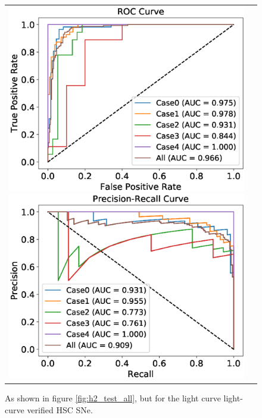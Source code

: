 \documentclass[proof]{pasj01}
\providecommand{\DIFadd}[1]{{\protect\color{blue} \sf #1}} %
\providecommand{\DIFdel}[1]{{\protect\color{red} \scriptsize #1}} %
\providecommand{\DIFaddFL}[1]{\DIFadd{#1}} %
\providecommand{\DIFdelFL}[1]{\DIFdel{#1}} %
\providecommand{\DIFaddbeginFL}{} %
\providecommand{\DIFaddendFL}{} %
\providecommand{\DIFdelbeginFL}{} %
\providecommand{\DIFdelendFL}{} %
\newcommand{\DIFscaledelfig}{0.5}
\newlength{\DIFdelgraphicswidth} %
\newlength{\DIFdelgraphicsheight} %
\newcommand{\DIFaddincludegraphics}[2][]{{\color{blue}\fbox{\DIFOincludegraphics[#1]{#2}}}} %
\newcommand{\DIFdelincludegraphics}[2][]{%
\sbox{\DIFdelgraphicsbox}{\DIFOincludegraphics[#1]{#2}}%
\settoboxwidth{\DIFdelgraphicswidth}{\DIFdelgraphicsbox} %
\settoboxtotalheight{\DIFdelgraphicsheight}{\DIFdelgraphicsbox} %
\scalebox{\DIFscaledelfig}{%
\parbox[b]{\DIFdelgraphicswidth}{\usebox{\DIFdelgraphicsbox}\\[-\baselineskip] \rule{\DIFdelgraphicswidth}{0em}}\llap{\resizebox{\DIFdelgraphicswidth}{\DIFdelgraphicsheight}{%
\setlength{\unitlength}{\DIFdelgraphicswidth}%
\begin{picture}(1,1)%
\thicklines\linethickness{2pt} %
{\color[rgb]{1,0,0}\put(0,0){\framebox(1,1){}}}%
{\color[rgb]{1,0,0}\put(0,0){\line( 1,1){1}}}%
{\color[rgb]{1,0,0}\put(0,1){\line(1,-1){1}}}%
\end{picture}%
}\hspace*{3pt}}} %
} %
\DeclareRobustCommand{\DIFaddbeginFL}{\DIFOaddbeginFL \let\includegraphics\DIFaddincludegraphics} %
\DeclareRobustCommand{\DIFaddendFL}{\DIFOaddendFL \let\includegraphics\DIFOincludegraphics} %
\DeclareRobustCommand{\DIFdelbeginFL}{\DIFOdelbeginFL \let\includegraphics\DIFdelincludegraphics} %
\DeclareRobustCommand{\DIFdelendFL}{\DIFOaddendFL \let\includegraphics\DIFOincludegraphics} %
\begin{document}
\begin{figure}[htbp]
    \begin{tabular}{cc}
        \begin{minipage}{0.5\hsize}
            \begin{center}
                \includegraphics[width=\columnwidth]{figures/10_absolute-magnitude-scaled-flux-remove-y_SNdata_test_190522_ROC_noedge_spec.eps}
            \end{center}
        \end{minipage}
        \begin{minipage}{0.5\hsize}
            \begin{center}
                \includegraphics[width=\columnwidth]{figures/10_absolute-magnitude-scaled-flux-remove-y_SNdata_test_190522_PreRec_noedge_spec.eps}
            \end{center}
        \end{minipage}
    \end{tabular}
    \vspace{2mm}
    \caption{%
  As \DIFaddbeginFL \DIFaddFL{shown }\DIFaddendFL in figure \ref{fig:h2_test_all}, but for the \DIFdelbeginFL \DIFdelFL{light curve }\DIFdelendFL \DIFaddbeginFL \DIFaddFL{light-curve }\DIFaddendFL verified HSC SNe. 
}%
    \label{fig:h2_test_gold}
\end{figure}
\end{document}
